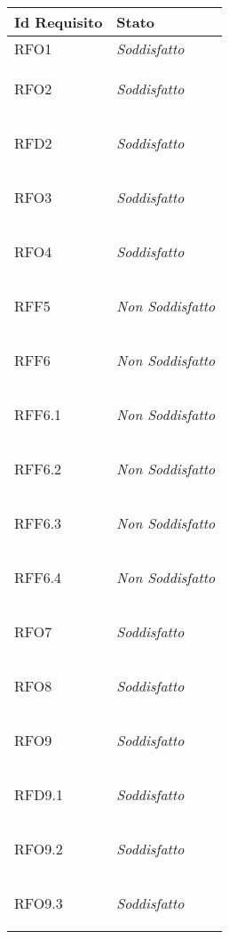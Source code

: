 \begin{longtable}{|>{\centering}m{5cm}|m{5cm}<{\centering}|}
    \hline
    \textbf{Id Requisito} & \textbf{Stato}\\
    \hline
    \endhead
    \hypertarget{RFO1}{RFO1} & \textit{Soddisfatto}\\ \hline
   
    \hypertarget{RFO2}{RFO2} & \textit{Soddisfatto}\\ \hline
   
    \hypertarget{RFD2}{RFD2} & \textit{Soddisfatto}\\ \hline
   
    \hypertarget{RFO3}{RFO3} & \textit{Soddisfatto}\\ \hline
   
    \hypertarget{RFO4}{RFO4} & \textit{Soddisfatto}\\ \hline
   
    \hypertarget{RFF5}{RFF5} & \textit{Non Soddisfatto}\\ \hline
   
    \hypertarget{RFF6}{RFF6} & \textit{Non Soddisfatto}\\ \hline
   
    \hypertarget{RFF6.1}{RFF6.1} & \textit{Non Soddisfatto}\\ \hline
   
    \hypertarget{RFF6.2}{RFF6.2} & \textit{Non Soddisfatto}\\ \hline
   
    \hypertarget{RFF6.3}{RFF6.3} & \textit{Non Soddisfatto}\\ \hline
   
    \hypertarget{RFF6.4}{RFF6.4} & \textit{Non Soddisfatto}\\ \hline
   
    \hypertarget{RFO7}{RFO7} & \textit{Soddisfatto}\\ \hline
   
    \hypertarget{RFO8}{RFO8} & \textit{Soddisfatto}\\ \hline
   
    \hypertarget{RFO9}{RFO9} & \textit{Soddisfatto}\\ \hline
   
    \hypertarget{RFD9.1}{RFD9.1}  & \textit{Soddisfatto}\\ \hline
   
    \hypertarget{RFO9.2}{RFO9.2} & \textit{Soddisfatto}\\ \hline
   
    \hypertarget{RFO9.3}{RFO9.3} & \textit{Soddisfatto}\\ \hline
   

\end{longtable}
